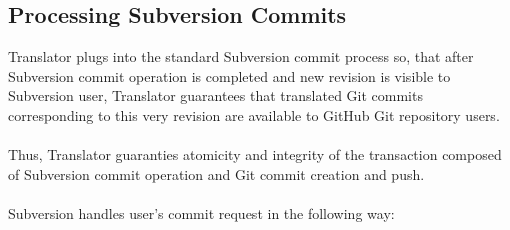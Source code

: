 \subsection{Processing Subversion Commits}

Translator plugs into the standard Subversion commit process so, that after Subversion commit operation
is completed and new revision is visible to Subversion user, Translator guarantees that translated Git commits
corresponding to this very revision are available to GitHub Git repository users.
\\\\
Thus, Translator guaranties atomicity and integrity of the transaction composed of Subversion commit operation
and Git commit creation and push.
\\\\
Subversion handles user's commit request in the following way:

